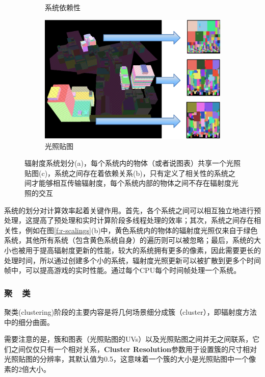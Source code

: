\begin{figure}
\begin{subfigure}[b]{0.285\textwidth}
		\caption{系统依赖性}
	\end{subfigure}
	\begin{subfigure}[b]{0.42\textwidth}
		\includegraphics[width=1.\textwidth]{figures/r/path-30-3}
		\caption{光照贴图}
	\end{subfigure}
	\caption{辐射度系统划分(a)，每个系统内的物体（或者说图表）共享一个光照贴图(c)，系统之间存在着依赖关系(b)，只有定义了相关性的系统之间才能够相互传输辐射度，每个系统内部的物体之间不存在辐射度光照的交互}
	\label{f:r-systems}
\end{figure}

系统的划分对计算效率起着关键作用。首先，各个系统之间可以相互独立地进行预处理，这提高了预处理和实时计算阶段多线程处理的效率；其次，系统之间存在相关性，例如在图\ref{f:r-scalings}(b)中，黄色系统内的物体的辐射度光照仅来自于绿色系统，其他所有系统（包含黄色系统自身）的遍历则可以被忽略；最后，系统的大小也被用于提高辐射度更新的性能，较大的系统拥有更多的像素，因此需要更长的处理时间，所以通过创建多个小的系统，辐射度光照更新可以被扩散到更多个时间帧中，可以提高游戏的实时性能。通过每个CPU每个时间帧处理一个系统。




\subsubsection{聚~~类}\label{sec:r-clustering}
聚类(clustering)阶段的主要内容是将几何场景细分成簇（cluster），即辐射度方法中的细分曲面。

需要注意的是，簇和图表（光照贴图的UVs）以及光照贴图之间并无之间联系，它们之间仅仅只有一个相对关系，\textbf{Cluster Resolution}参数用于设置簇的尺寸相对光照贴图的分辨率，其默认值为0.5，这意味着一个簇的大小是光照贴图中一个像素的2倍大小。

